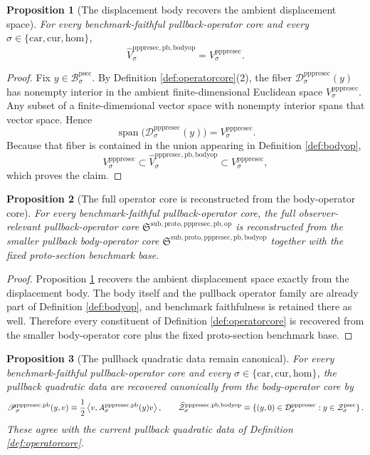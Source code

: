 \documentclass[11pt]{article}
\newcommand{\Car}{\mathrm{car}}
\newcommand{\Cur}{\mathrm{cur}}
\newcommand{\Hom}{\mathrm{hom}}
\newcommand{\ProtoSectionBody}[1]{\mathcal B_{#1}^{\mathrm{psec}}}
\newcommand{\ProtoSectionShell}[1]{\mathcal Z_{#1}^{\mathrm{psec}}}
\newcommand{\PrePreProtoSectionVertical}[1]{V_{#1}^{\mathrm{pppresec}}}
\newcommand{\PrePreProtoSectionResidualBody}[1]{\mathcal D_{#1}^{\mathrm{pppresec}}}
\newcommand{\PrePreProtoSectionPullbackOperator}[1]{A_{#1}^{\mathrm{pppresec,pb}}}
\newcommand{\PrePreProtoSectionPullbackFunctional}[1]{\mathscr P_{#1}^{\mathrm{pppresec,pb}}}
\newcommand{\PullbackOperatorCore}{\mathfrak S^{\mathrm{sub,proto,pppresec,pb,op}}}
\newcommand{\PullbackBodyOperatorCore}{\mathfrak S^{\mathrm{sub,proto,pppresec,pb,bodyop}}}
\newcommand{\RecoveredBodyOperatorSpace}[1]{\widehat V_{#1}^{\mathrm{pppresec,pb,bodyop}}}
\newcommand{\RecoveredPullbackShell}[1]{\widehat{\mathcal Z}_{#1}^{\mathrm{pppresec,pb,bodyop}}}
\newtheorem{proposition}{Proposition}
\begin{document}
\begin{proposition}[The displacement body recovers the ambient displacement space]
\label{prop:recover_space}
For every benchmark-faithful pullback-operator core and every \(\sigma\in\{\Car,\Cur,\Hom\}\),
\[
\RecoveredBodyOperatorSpace{\sigma}
=
\PrePreProtoSectionVertical{\sigma}.
\]
\end{proposition}

\begin{proof}
Fix \(y\in\ProtoSectionBody{\sigma}\). By Definition \ref{def:operatorcore}(2), the fiber \(\PrePreProtoSectionResidualBody{\sigma}(y)\) has nonempty interior in the ambient finite-dimensional Euclidean space \(\PrePreProtoSectionVertical{\sigma}\). Any subset of a finite-dimensional vector space with nonempty interior spans that vector space. Hence
\[
\operatorname{span}\bigl(\PrePreProtoSectionResidualBody{\sigma}(y)\bigr)
=
\PrePreProtoSectionVertical{\sigma}.
\]
Because that fiber is contained in the union appearing in Definition \ref{def:bodyop},
\[
\PrePreProtoSectionVertical{\sigma}
\subset
\RecoveredBodyOperatorSpace{\sigma}
\subset
\PrePreProtoSectionVertical{\sigma},
\]
which proves the claim.
\end{proof}

\begin{proposition}[The full operator core is reconstructed from the body-operator core]
\label{prop:reconstruct}
For every benchmark-faithful pullback-operator core, the full observer-relevant pullback-operator core \(\PullbackOperatorCore\) is reconstructed from the smaller pullback body-operator core \(\PullbackBodyOperatorCore\) together with the fixed proto-section benchmark base.
\end{proposition}

\begin{proof}
Proposition \ref{prop:recover_space} recovers the ambient displacement space exactly from the displacement body. The body itself and the pullback operator family are already part of Definition \ref{def:bodyop}, and benchmark faithfulness is retained there as well. Therefore every constituent of Definition \ref{def:operatorcore} is recovered from the smaller body-operator core plus the fixed proto-section benchmark base.
\end{proof}

\begin{proposition}[The pullback quadratic data remain canonical]
\label{prop:recover_quadratic}
For every benchmark-faithful pullback-operator core and every \(\sigma\in\{\Car,\Cur,\Hom\}\), the pullback quadratic data are recovered canonically from the body-operator core by
\[
\PrePreProtoSectionPullbackFunctional{\sigma}(y,v)
\equiv
\frac{1}{2}
\ev{v,\PrePreProtoSectionPullbackOperator{\sigma}(y)v},
\qquad
\RecoveredPullbackShell{\sigma}
\equiv
\left\{
(y,0)\in\PrePreProtoSectionResidualBody{\sigma}:y\in\ProtoSectionShell{\sigma}
\right\}.
\]
These agree with the current pullback quadratic data of Definition \ref{def:operatorcore}.
\end{proposition}
\end{document}
